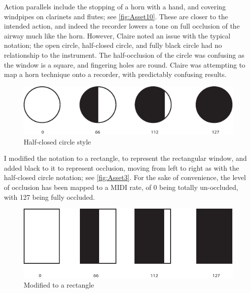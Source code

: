 Action parallels include the stopping of a horn with a hand, and covering windpipes on clarinets and flutes; see \autoref{fig:Asset10}. 
These are closer to the intended action, and indeed the recorder lowers a tone on full occlusion of the airway much like the horn. 
However, Claire noted an issue with the typical notation; the open circle, half-closed circle, and fully black circle had no relationship to the instrument. 
The half-occlusion of the circle was confusing as the window is a square, and fingering holes are round.
Claire was attempting to map a horn technique onto a recorder, with predictably confusing results. 

\begin{figure}
\includegraphics[width=\linewidth]{./resources/Asset10.pdf}
\caption{Half-closed circle style}\label{fig:Asset10}
\end{figure}


I modified the notation to a rectangle, to represent the rectangular window, and added black to it to represent occlusion, moving from left to right as with the half-closed circle notation; see \autoref{fig:Asset3}.
For the sake of convenience, the level of occlusion has been mapped to a MIDI rate, of 0 being totally un-occluded, with 127 being fully occluded.

\begin{figure}
\includegraphics[width=\linewidth]{./resources/Asset3.pdf}
\caption{Modified to a rectangle}\label{fig:Asset3}
\end{figure}

